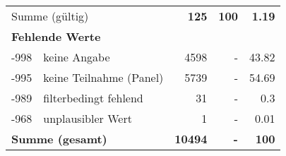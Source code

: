 \begin{longtable}{lXrrr}
     \midrule
     \multicolumn{2}{l}{Summe (gültig)} &
       \textbf{\num{125}} &
     \textbf{\num{100}} &
       \textbf{\num[round-mode=places,round-precision=2]{1.19}} \\
     \multicolumn{5}{l}{\textbf{Fehlende Werte}}\\
       -998 &
       keine Angabe &
         \num{4598} &
        - &
         \num[round-mode=places,round-precision=2]{43.82} \\
       -995 &
       keine Teilnahme (Panel) &
         \num{5739} &
        - &
         \num[round-mode=places,round-precision=2]{54.69} \\
       -989 &
       filterbedingt fehlend &
         \num{31} &
        - &
         \num[round-mode=places,round-precision=2]{0.3} \\
       -968 &
       unplausibler Wert &
         \num{1} &
        - &
         \num[round-mode=places,round-precision=2]{0.01} \\
     \midrule
     \multicolumn{2}{l}{\textbf{Summe (gesamt)}} &
          \textbf{\num{10494}} &
        \textbf{-} &
        \textbf{\num{100}} \\
     \bottomrule
     \end{longtable}
     
